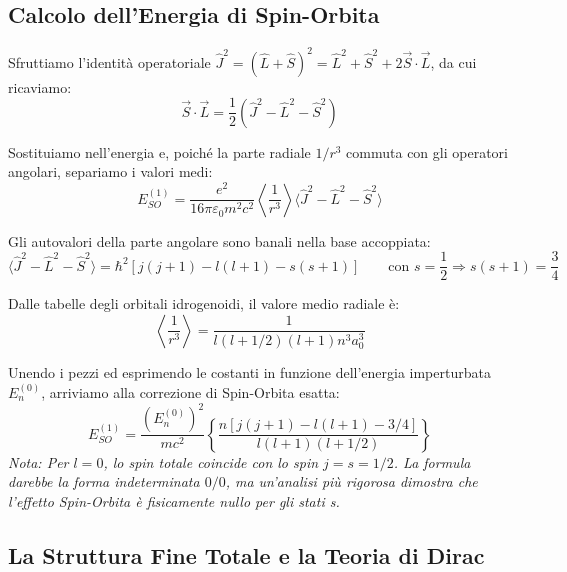 \documentclass[11pt, a4paper]{article}
\begin{document}
\subsection{Calcolo dell'Energia di Spin-Orbita} %

Sfruttiamo l'identità operatoriale $\hat{J}^2 = (\hat{L} + \hat{S})^2 = \hat{L}^2 + \hat{S}^2 + 2\vec{S} \cdot \vec{L}$, da cui ricaviamo: %
\begin{equation*}
    \vec{S} \cdot \vec{L} = \frac{1}{2} (\hat{J}^2 - \hat{L}^2 - \hat{S}^2) %
\end{equation*}

\noindent
Sostituiamo nell'energia e, poiché la parte radiale $1/r^3$ commuta con gli operatori angolari, separiamo i valori medi: %
\begin{equation}
    E_{SO}^{(1)} = \frac{e^2}{16\pi\varepsilon_0 m^2 c^2} \left\langle \frac{1}{r^3} \right\rangle \langle \hat{J}^2 - \hat{L}^2 - \hat{S}^2 \rangle %
\end{equation}

Gli autovalori della parte angolare sono banali nella base accoppiata: %
\begin{equation*}
    \langle \hat{J}^2 - \hat{L}^2 - \hat{S}^2 \rangle = \hbar^2 \left[ j(j+1) - l(l+1) - s(s+1) \right] \qquad \text{con } s = \frac{1}{2} \Rightarrow s(s+1) = \frac{3}{4} %
\end{equation*}

Dalle tabelle degli orbitali idrogenoidi, il valore medio radiale è: %
\begin{equation*}
    \left\langle \frac{1}{r^3} \right\rangle = \frac{1}{l(l+1/2)(l+1) n^3 a_0^3} %
\end{equation*}

\noindent
Unendo i pezzi ed esprimendo le costanti in funzione dell'energia imperturbata $E_n^{(0)}$, arriviamo alla correzione di Spin-Orbita esatta: %
\begin{equation}
    E_{SO}^{(1)} = \frac{(E_n^{(0)})^2}{m c^2} \left\{ \frac{n [j(j+1) - l(l+1) - 3/4]}{l(l+1)(l+1/2)} \right\} %
\end{equation}
\textit{Nota: Per $l=0$, lo spin totale coincide con lo spin $j=s=1/2$. La formula darebbe la forma indeterminata $0/0$, ma un'analisi più rigorosa dimostra che l'effetto Spin-Orbita è fisicamente nullo per gli stati s.} %

\subsection{La Struttura Fine Totale e la Teoria di Dirac} %
\end{document}
